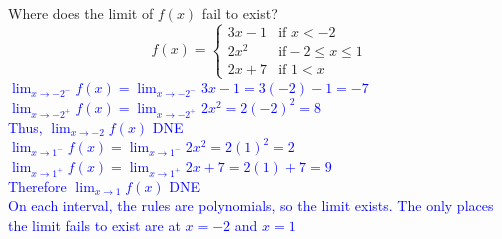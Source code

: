 \documentclass{ximera}
\begin{document}
\begin{exercise}
    Where does the limit of $f(x)$ fail to exist?  
      \[f(x)=
    \begin{cases}
    3x-1 &\text{if }x<-2\\
    2x^2 &\text{if} -2\leq x\leq 1\\
    2x+7 & \text{if } 1<x
    \end{cases}\]
    \textcolor{blue}{ $\displaystyle \lim_{x\rightarrow -2^-}f(x)=\lim_{x\rightarrow -2^-} 3x-1=3(-2)-1=-7$\\
    $\displaystyle \lim_{x\rightarrow -2^+} f(x)=\lim_{x\rightarrow -2^+ }2x^2=2(-2)^2=8$\\
    Thus, $\displaystyle \lim_{x\rightarrow -2}f(x)$ DNE\\
    $\displaystyle\lim_{x\rightarrow 1^-} f(x)=\lim_{x\rightarrow 1^-} 2x^2=2(1)^2=2$\\
    $\displaystyle\lim_{x\rightarrow 1^+} f(x)=\lim_{x\rightarrow 1^+} 2x+7=2(1)+7=9$\\
    Therefore $\displaystyle\lim_{x\rightarrow 1} f(x)$ DNE\\
    On each interval, the rules are polynomials, so the limit exists.  The only places the limit fails to exist are at $x=-2$ and $x=1$} \\
\end{exercise}
\end{document}
